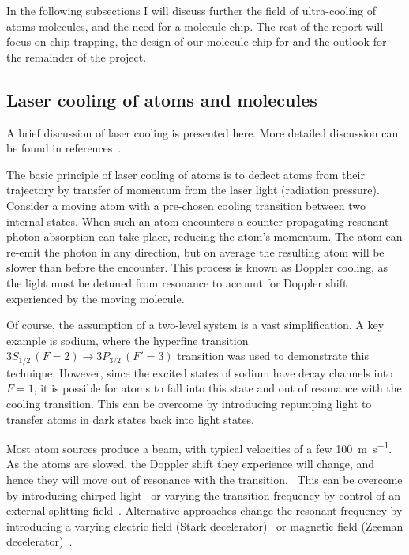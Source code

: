 In the following subsections I will discuss further the field of ultra-cooling
of atoms molecules, and the need for a molecule chip. The rest of the report
will focus on chip trapping, the design of our molecule chip for \CaF and the
outlook for the remainder of the project.

\subsection{Laser cooling of atoms and molecules}
\label{intro:lasercool}

A brief discussion of laser cooling is presented here. More detailed discussion
can be found in references~\cite{Metcalf1999,RevModPhys.70.721,McCarron_2018}.

The basic principle of laser cooling of atoms is to deflect atoms from their
trajectory by transfer of momentum from the laser light (radiation
pressure).~\cite{RevModPhys.70.721} Consider a moving atom with a
pre-chosen cooling transition between two internal states.  When such an atom
encounters a counter-propagating resonant photon absorption can take place,
reducing the atom's momentum. The atom can re-emit the photon in any direction,
but on average the resulting atom will be slower than before the encounter.
This process is known as Doppler cooling, as the light must be detuned from
resonance to account for Doppler shift experienced by the moving
molecule.~\cite{Metcalf1999}

Of course, the assumption of a two-level system is a vast simplification.  A key
example is sodium, where the hyperfine transition $3S_{1/2}\, (F=2) \rightarrow
3P_{3/2}\, (F'=3)$ transition was used to demonstrate this technique. However,
since the excited states of sodium have decay channels into $F=1$, it is
possible for atoms to fall into this state and out of resonance with the
cooling transition.  This can be overcome by introducing repumping light to
transfer atoms in dark states back into light states.~\cite{RevModPhys.70.721}

Most atom sources produce a beam, with typical velocities of a few
\SI{100}{\metre\per\second}.~\cite{Metcalf1999,}  As the atoms are slowed, the
Doppler shift they experience will change, and hence they will move out of
resonance with the transition.~\cite{RevModPhys.70.721} This can be overcome by
introducing chirped light~\cite{Prodan1984} or varying the transition frequency
by control of an external splitting field~\cite{PhysRevLett.48.596}. Alternative
approaches change the resonant frequency by introducing a varying electric field
(Stark decelerator)~\cite{Bethlem1999} or magnetic field (Zeeman
decelerator)~\cite{PhysRevLett.48.596}.

